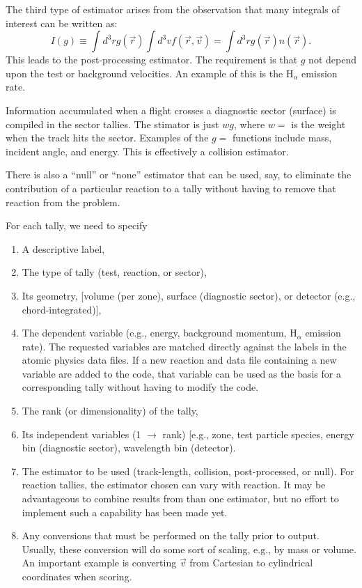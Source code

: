 \documentclass[12pt]{report}
\begin{document}
The third type of estimator arises from the observation that 
many integrals of interest can be written as:
\begin{equation}
I(g) \equiv \int d^{3}r g(\vec{r}) \int d^{3}v f(\vec{r},\vec{v}) = 
\int d^{3} r g(\vec{r}) n(\vec{r}).
\end{equation}
This leads to the post-processing estimator. The requirement is that 
$g$ not depend upon the test or background velocities. An example of
this is the H$_{\alpha}$ emission rate.

Information accumulated when a flight crosses a diagnostic sector (surface)
is compiled in the sector tallies. The
stimator is just $w g$, where
$w =$ is the weight when the track hits the sector.
Examples of the $g =$ functions include mass, incident angle, and energy.
This is effectively a collision estimator.

There is also a ``null'' or ``none''
estimator that can be used, say, to eliminate the
contribution of a particular reaction to a tally without having to 
remove that reaction from the problem.

For each tally, we need to specify
\begin{enumerate}
  \item A descriptive label,
  \item The type of tally (test, reaction, or sector),
  \item Its geometry, [volume (per zone), surface (diagnostic sector),
or detector (e.g., chord-integrated)],
  \item The dependent variable (e.g., energy, background momentum,
H$_{\alpha}$ emission rate). The requested variables 
are matched directly against the labels in the atomic physics data files.
If a new reaction and data file containing a new variable are added to
the code, that variable can be used as the basis for a corresponding tally
without having to modify the code.
  \item The rank (or dimensionality) of the tally,
  \item Its independent variables (1 $\rightarrow$ rank) [e.g.,
zone, test particle species, energy bin (diagnostic sector),
wavelength bin (detector).
  \item The estimator to be used (track-length, collision, post-processed,
or null). For reaction tallies, the estimator chosen can vary with
reaction. It may be advantageous to combine results 
from than one estimator, but no effort to implement such a capability
has been made yet.
  \item Any conversions that must be performed on the tally prior to
output.
Usually, these conversion will do some sort of scaling, e.g., by
mass or volume. An important example is 
converting $\vec{v}$ from Cartesian
to cylindrical coordinates when scoring.
\end{enumerate}
\end{document}
